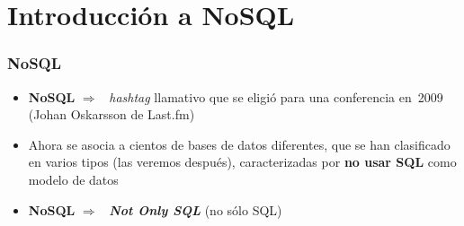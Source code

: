 \documentclass[14pt]{beamer}
\newcommand{\ra}{{\color{mdwrojo} $\Rightarrow${}~{}}}
\begin{document}


\section{Introducción a NoSQL}

\begin{frame}
  \frametitle{NoSQL}
\begin{itemize}
\item {\bf NoSQL} \ra{} {\em hashtag\/} llamativo que se
  eligió para una conferencia en~2009 (Johan Oskarsson de Last.fm)
\item Ahora se asocia a cientos de bases de datos diferentes,
  que se han clasificado en varios tipos (las veremos después),
  caracterizadas por {\bf no usar SQL} como modelo de datos
\item {\bf NoSQL} \ra{} {\bfseries\itshape Not Only SQL} (no sólo SQL)
  \end{itemize}
\end{frame}

\end{document}
